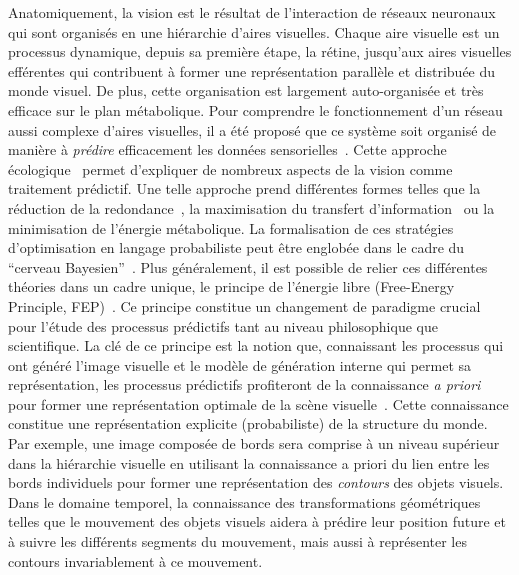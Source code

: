 \documentclass[11pt,french,a4paper,oneside]{article}%
\begin{document}
Anatomiquement, la vision est le résultat de l'interaction de réseaux
neuronaux qui sont organisés en une hiérarchie d'aires visuelles.
Chaque aire visuelle est un processus dynamique, depuis sa
première étape, la rétine, jusqu'aux aires visuelles efférentes qui
contribuent à former une représentation parallèle et distribuée du monde
visuel. De plus, cette organisation est largement auto-organisée et très
efficace sur le plan métabolique. Pour comprendre le fonctionnement d'un réseau aussi
complexe d'aires visuelles, il a été proposé que ce système soit
organisé de manière à \emph{prédire} efficacement les données
sensorielles~\citep{Attneave54}. Cette approche écologique~\citep{Atick92}
permet d'expliquer de nombreux aspects de la vision comme traitement
prédictif. Une telle approche prend différentes formes telles que la
réduction de la redondance~\citep{Barlow61}, la maximisation du transfert
d'information~\citep{Linsker90} ou la minimisation de l'énergie
métabolique. La formalisation de ces stratégies d'optimisation en
langage probabiliste peut être englobée dans le cadre du ``cerveau
Bayesien''~\citep{Knill04}. Plus généralement, il est possible de
relier ces différentes théories dans un cadre unique, le principe de
l'énergie libre (Free-Energy Principle, FEP)~\citep{Friston10}. Ce principe constitue un
changement de paradigme crucial pour l'étude des processus prédictifs
tant au niveau philosophique que scientifique. La clé de ce principe est
la notion que, connaissant les processus qui ont généré l'image visuelle
et le modèle de génération interne qui permet sa représentation, les
processus prédictifs profiteront de la connaissance \emph{a priori} pour
former une représentation optimale de la scène visuelle~\citep{Rao99}. Cette connaissance constitue une représentation explicite
(probabiliste) de la structure du monde. Par exemple, une image composée
de bords sera comprise à un niveau supérieur dans la hiérarchie visuelle en utilisant la
connaissance a priori du lien entre les bords individuels pour former
une représentation des \emph{contours} des objets visuels. Dans le
domaine temporel, la connaissance des transformations géométriques
telles que le mouvement des objets visuels aidera à prédire leur
position future et à suivre les différents segments du mouvement, mais aussi
à représenter les contours invariablement à ce mouvement.
\end{document}
